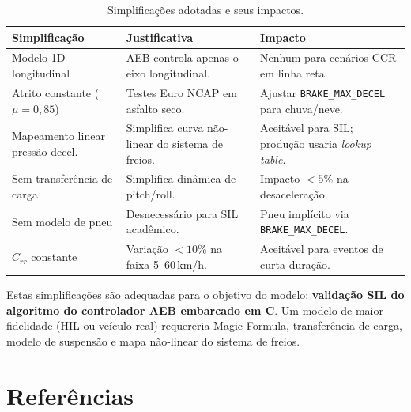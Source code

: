 \documentclass[12pt,a4paper]{article}
\newcommand{\param}[1]{\texttt{\color{laranjacode}#1}}
\begin{document}
\begin{table}[H]
  \centering
  \caption{Simplificações adotadas e seus impactos.}
  \begin{tabularx}{\linewidth}{lXX}
    \toprule
    \rowcolor{azulescuro!90}
    \color{white}\textbf{Simplificação} &
    \color{white}\textbf{Justificativa} &
    \color{white}\textbf{Impacto} \\
    \midrule
    Modelo 1D longitudinal &
      AEB controla apenas o eixo longitudinal. &
      Nenhum para cenários CCR em linha reta. \\
    \rowcolor{azulclaro!50}
    Atrito constante ($\mu = 0{,}85$) &
      Testes Euro NCAP em asfalto seco. &
      Ajustar \param{BRAKE\_MAX\_DECEL} para chuva/neve. \\
    Mapeamento linear pressão-decel. &
      Simplifica curva não-linear do sistema de freios. &
      Aceitável para SIL; produção usaria \emph{lookup table}. \\
    \rowcolor{azulclaro!50}
    Sem transferência de carga &
      Simplifica dinâmica de pitch/roll. &
      Impacto $< 5$\% na desaceleração. \\
    Sem modelo de pneu &
      Desnecessário para SIL acadêmico. &
      Pneu implícito via \param{BRAKE\_MAX\_DECEL}. \\
    \rowcolor{azulclaro!50}
    $C_{rr}$ constante &
      Variação $< 10$\% na faixa 5--60\,km/h. &
      Aceitável para eventos de curta duração. \\
    \bottomrule
  \end{tabularx}
\end{table}

Estas simplificações são adequadas para o objetivo do modelo: \textbf{validação SIL
do algoritmo do controlador AEB embarcado em C}. Um modelo de maior fidelidade
(HIL ou veículo real) requereria Magic Formula, transferência de carga, modelo
de suspensão e mapa não-linear do sistema de freios.

\section{Referências}
\label{sec:refs}
\end{document}
